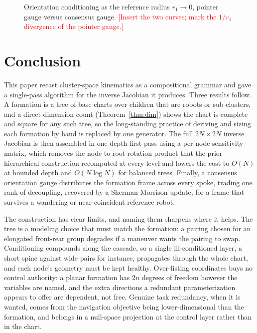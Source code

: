 \documentclass[conference]{IEEEtran}
\newcommand{\fillnote}[1]{\textcolor{red}{[#1]}} %
\begin{document}
\begin{figure}[t]
\centering
\framebox[0.9\linewidth]{\rule{0pt}{3.0cm} \fillnote{Fig: orientation-block condition number vs $r_1$, pointer vs consensus}}
\caption{Orientation conditioning as the reference radius $r_1 \to 0$, pointer
gauge versus consensus gauge. \fillnote{Insert the two curves; mark the $1/r_1$
divergence of the pointer gauge.}}
\label{fig:gauge}
\end{figure}

\section{Conclusion}
\label{sec:conclusion}

This paper recast cluster-space kinematics as a compositional grammar and gave a
single-pass algorithm for the inverse Jacobian it produces. Three results follow.
A formation is a tree of base charts over children that are robots or
sub-clusters, and a direct dimension count (Theorem~\ref{thm:dim}) shows the
chart is complete and square for any such tree, so the long-standing practice of
deriving and sizing each formation by hand is replaced by one generator. The full
$2N \times 2N$ inverse Jacobian is then assembled in one depth-first pass using a
per-node sensitivity matrix, which removes the node-to-root rotation product that
the prior hierarchical construction recomputed at every level and lowers the cost
to $O(N)$ at bounded depth and $O(N \log N)$ for balanced trees. Finally, a
consensus orientation gauge distributes the formation frame across every spoke,
trading one rank of decoupling, recovered by a Sherman-Morrison update, for a
frame that survives a wandering or near-coincident reference robot.

The construction has clear limits, and naming them sharpens where it helps. The
tree is a modeling choice that must match the formation: a pairing chosen for an
elongated front-rear group degrades if a maneuver wants the pairing to swap.
Conditioning compounds along the cascade, so a single ill-conditioned layer, a
short spine against wide pairs for instance, propagates through the whole chart,
and each node's geometry must be kept healthy. Over-listing coordinates buys no
control authority: a planar formation has $2n$ degrees of freedom however the
variables are named, and the extra directions a redundant parameterization
appears to offer are dependent, not free. Genuine task redundancy, when it is
wanted, comes from the navigation objective being lower-dimensional than the
formation, and belongs in a null-space projection at the control layer rather
than in the chart.
\end{document}
